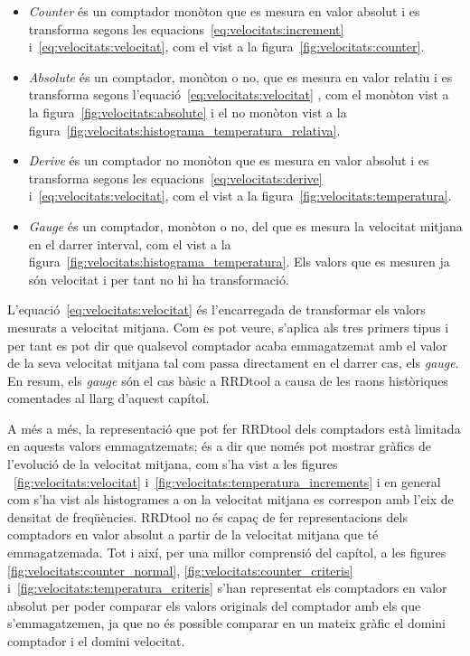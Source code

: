 \begin{itemize}

\item \emph{Counter} és un comptador monòton que es mesura en valor absolut i es transforma segons les equacions~\ref{eq:velocitats:increment} i~\ref{eq:velocitats:velocitat},  com el vist a la figura~\ref{fig:velocitats:counter}.

\item \emph{Absolute} és un comptador, monòton o no, que es mesura en valor relatiu i es transforma segons l'equació~\ref{eq:velocitats:velocitat} , com el monòton vist a la figura~\ref{fig:velocitats:absolute}  i el no monòton vist a la figura~\ref{fig:velocitats:histograma_temperatura_relativa}.

\item \emph{Derive} és un comptador no monòton que es mesura en valor absolut i es transforma segons les equacions~\ref{eq:velocitats:derive} i~\ref{eq:velocitats:velocitat}, com el vist a la figura~\ref{fig:velocitats:temperatura}.

\item \emph{Gauge} és un comptador, monòton o no, del que es mesura la velocitat mitjana en el darrer interval, com el vist a la figura~\ref{fig:velocitats:histograma_temperatura}. Els valors que es mesuren ja són velocitat i per tant no hi ha transformació.

\end{itemize}

L'equació~\ref{eq:velocitats:velocitat} és l'encarregada de transformar els valors mesurats a velocitat mitjana. Com es pot veure, s'aplica als tres primers tipus i per tant es pot dir que qualsevol comptador acaba emmagatzemat amb el valor de la seva velocitat mitjana tal com passa directament en el darrer cas, els \emph{gauge}. En resum, els \emph{gauge} són el cas bàsic a RRDtool a causa de les raons històriques comentades al llarg d'aquest capítol. 

A més a més, la representació que pot fer RRDtool dels comptadors està limitada en aquests valors emmagatzemats; és a dir que només pot mostrar gràfics de l'evolució de la velocitat mitjana, com s'ha vist a les figures ~\ref{fig:velocitats:velocitat} i~\ref{fig:velocitats:temperatura_increments} i en general com s'ha vist als histogrames a on la velocitat mitjana es correspon amb l'eix de densitat de freqüències. 
RRDtool no és capaç de fer representacions dels comptadors en valor absolut a partir de la velocitat mitjana que té emmagatzemada. Tot i així, per una millor comprensió del capítol, 
a les figures \ref{fig:velocitats:counter_normal}, \ref{fig:velocitats:counter_criteris} i~\ref{fig:velocitats:temperatura_criteris} s'han representat els comptadors en valor absolut per poder comparar els valors originals del comptador amb els que s'emmagatzemen, ja que no és possible comparar en un mateix gràfic el domini comptador i el domini velocitat. 


